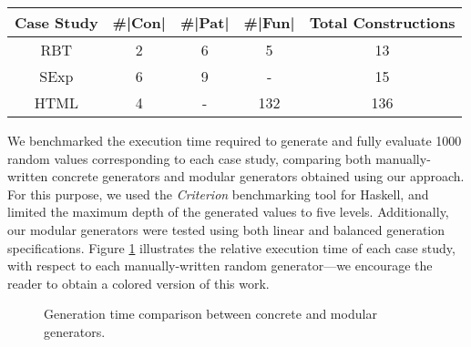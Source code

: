 \begin{table}[H]
  \begin{tabular}{||c||c||c||c||c||}
    \hline
    Case Study & \#|Con| & \#|Pat| & \#|Fun| & Total Constructions \\ \hline
    \hline
    RBT        & 2      & 6      & 5      & 13                  \\ \hline
    SExp       & 6      & 9      & -      & 15                  \\ \hline
    HTML       & 4      & -      & 132    & 136                 \\ \hline
  \end{tabular}
\end{table}

We benchmarked the execution time required to generate and fully evaluate 1000
random values corresponding to each case study, comparing both manually-written
concrete generators and modular generators obtained using our approach.
%
For this purpose, we used the \emph{Criterion} benchmarking tool for Haskell,
and limited the maximum depth of the generated values to five levels.
%
Additionally, our modular generators were tested using both linear and balanced
generation specifications.
%
Figure \ref{fig:times} illustrates the relative execution time of each case
study, with respect to each manually-written random generator---we encourage the
reader to obtain a colored version of this work.

\begin{figure}[b]
  \centering
  \caption{Generation time comparison between concrete and modular generators.}
  \label{fig:times}
\end{figure}

